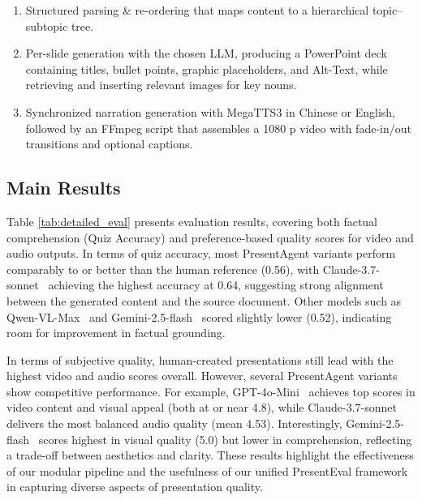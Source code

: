 \documentclass[11pt]{article}
\begin{document}
\begin{enumerate}[leftmargin=*,itemsep=2pt]

\item Structured parsing \& re-ordering that maps content to a hierarchical topic–subtopic tree.

\item Per-slide generation with the chosen LLM, producing a PowerPoint deck containing titles, bullet points, graphic placeholders, and Alt-Text, while retrieving and inserting relevant images for key nouns.

\item Synchronized narration generation with MegaTTS3 in Chinese or English, followed by an FFmpeg script that assembles a 1080 p video with fade-in/out transitions and optional captions.

\end{enumerate}
















\subsection{Main Results}

Table \ref{tab:detailed_eval} presents evaluation results, covering both factual comprehension (Quiz Accuracy) and preference-based quality scores for video and audio outputs. In terms of quiz accuracy, most PresentAgent variants perform comparably to or better than the human reference (0.56), with Claude-3.7-sonnet~\cite{claude3} achieving the highest accuracy at 0.64, suggesting strong alignment between the generated content and the source document. Other models such as Qwen-VL-Max~\cite{bai2025qwen2} and Gemini-2.5-flash~\cite{gemini2.5flash} scored slightly lower (0.52), indicating room for improvement in factual grounding.

In terms of subjective quality, human-created presentations still lead with the highest video and audio scores overall. However, several PresentAgent variants show competitive performance. For example, GPT-4o-Mini~\cite{achiam2023gpt} achieves top scores in video content and visual appeal (both at or near 4.8), while Claude-3.7-sonnet~\cite{claude3} delivers the most balanced audio quality (mean 4.53). Interestingly, Gemini-2.5-flash~\cite{gemini2.5flash} scores highest in visual quality (5.0) but lower in comprehension, reflecting a trade-off between aesthetics and clarity. These results highlight the effectiveness of our modular pipeline and the usefulness of our unified PresentEval framework in capturing diverse aspects of presentation quality.
\end{document}
